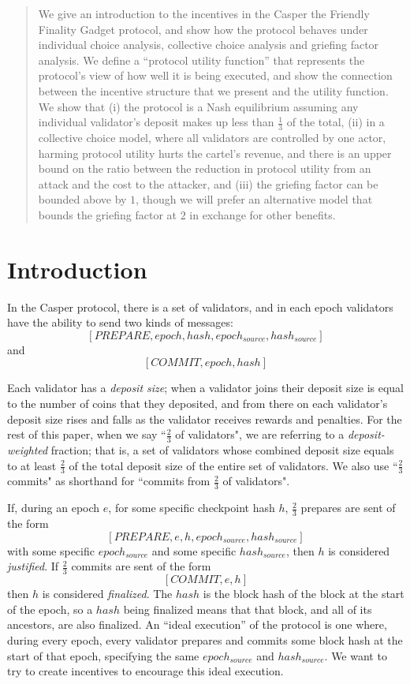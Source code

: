 \documentclass[12pt]{article}
\begin{document}
\maketitle
\begin{abstract}
We give an introduction to the incentives in the Casper the Friendly Finality Gadget protocol, and show how the protocol behaves under individual choice analysis, collective choice analysis and griefing factor analysis. We define a ``protocol utility function'' that represents the protocol's view of how well it is being executed, and show the connection between the incentive structure that we present and the utility function. We show that (i) the protocol is a Nash equilibrium assuming any individual validator's deposit makes up less than $\frac{1}{3}$ of the total, (ii) in a collective choice model, where all validators are controlled by one actor, harming protocol utility hurts the cartel's revenue, and there is an upper bound on the ratio between the reduction in protocol utility from an attack and the cost to the attacker, and (iii) the griefing factor can be bounded above by $1$, though we will prefer an alternative model that bounds the griefing factor at $2$ in exchange for other benefits.
\end{abstract}

\section{Introduction}
In the Casper protocol, there is a set of validators, and in each epoch validators have the ability to send two kinds of messages: $$[PREPARE, epoch, hash, epoch_{source}, hash_{source}]$$ and $$[COMMIT, epoch, hash]$$

Each validator has a \textit{deposit size}; when a validator joins their deposit size is equal to the number of coins that they deposited, and from there on each validator's deposit size rises and falls as the validator receives rewards and penalties. For the rest of this paper, when we say ``$\frac{2}{3}$ of validators", we are referring to a \textit{deposit-weighted} fraction; that is, a set of validators whose combined deposit size equals to at least $\frac{2}{3}$ of the total deposit size of the entire set of validators. We also use ``$\frac{2}{3}$ commits" as shorthand for ``commits from $\frac{2}{3}$ of validators".

If, during an epoch $e$, for some specific checkpoint hash $h$, $\frac{2}{3}$ prepares are sent of the form $$[PREPARE, e, h, epoch_{source}, hash_{source}]$$ with some specific $epoch_{source}$ and some specific $hash_{source}$, then $h$ is considered \textit{justified}. If $\frac{2}{3}$ commits are sent of the form $$[COMMIT, e, h]$$ then $h$ is considered \textit{finalized}. The $hash$ is the block hash of the block at the start of the epoch, so a $hash$ being finalized means that that block, and all of its ancestors, are also finalized. An ``ideal execution'' of the protocol is one where, during every epoch, every validator prepares and commits some block hash at the start of that epoch, specifying the same $epoch_{source}$ and $hash_{source}$. We want to try to create incentives to encourage this ideal execution.
\end{document}
